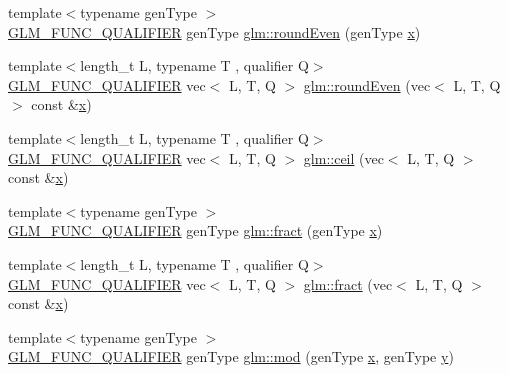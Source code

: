 \begin{DoxyCompactItemize}
\item 
{\footnotesize template$<$typename gen\+Type $>$ }\\\hyperlink{setup_8hpp_a33fdea6f91c5f834105f7415e2a64407}{G\+L\+M\+\_\+\+F\+U\+N\+C\+\_\+\+Q\+U\+A\+L\+I\+F\+I\+ER} gen\+Type \hyperlink{namespaceglm_ae02684863360f29d6e9fb9b5ad4ab5d9}{glm\+::round\+Even} (gen\+Type \hyperlink{_s_d_l__opengl_8h_ad0e63d0edcdbd3d79554076bf309fd47}{x})
\item 
{\footnotesize template$<$length\+\_\+t L, typename T , qualifier Q$>$ }\\\hyperlink{setup_8hpp_a33fdea6f91c5f834105f7415e2a64407}{G\+L\+M\+\_\+\+F\+U\+N\+C\+\_\+\+Q\+U\+A\+L\+I\+F\+I\+ER} vec$<$ L, T, Q $>$ \hyperlink{group__core__func__common_ga76b81785045a057989a84d99aeeb1578}{glm\+::round\+Even} (vec$<$ L, T, Q $>$ const \&\hyperlink{_s_d_l__opengl_8h_ad0e63d0edcdbd3d79554076bf309fd47}{x})
\item 
{\footnotesize template$<$length\+\_\+t L, typename T , qualifier Q$>$ }\\\hyperlink{setup_8hpp_a33fdea6f91c5f834105f7415e2a64407}{G\+L\+M\+\_\+\+F\+U\+N\+C\+\_\+\+Q\+U\+A\+L\+I\+F\+I\+ER} vec$<$ L, T, Q $>$ \hyperlink{group__core__func__common_gafb9d2a645a23aca12d4d6de0104b7657}{glm\+::ceil} (vec$<$ L, T, Q $>$ const \&\hyperlink{_s_d_l__opengl_8h_ad0e63d0edcdbd3d79554076bf309fd47}{x})
\item 
{\footnotesize template$<$typename gen\+Type $>$ }\\\hyperlink{setup_8hpp_a33fdea6f91c5f834105f7415e2a64407}{G\+L\+M\+\_\+\+F\+U\+N\+C\+\_\+\+Q\+U\+A\+L\+I\+F\+I\+ER} gen\+Type \hyperlink{group__core__func__common_ga8ba89e40e55ae5cdf228548f9b7639c7}{glm\+::fract} (gen\+Type \hyperlink{_s_d_l__opengl_8h_ad0e63d0edcdbd3d79554076bf309fd47}{x})
\item 
{\footnotesize template$<$length\+\_\+t L, typename T , qualifier Q$>$ }\\\hyperlink{setup_8hpp_a33fdea6f91c5f834105f7415e2a64407}{G\+L\+M\+\_\+\+F\+U\+N\+C\+\_\+\+Q\+U\+A\+L\+I\+F\+I\+ER} vec$<$ L, T, Q $>$ \hyperlink{group__core__func__common_ga2df623004f634b440d61e018d62c751b}{glm\+::fract} (vec$<$ L, T, Q $>$ const \&\hyperlink{_s_d_l__opengl_8h_ad0e63d0edcdbd3d79554076bf309fd47}{x})
\item 
{\footnotesize template$<$typename gen\+Type $>$ }\\\hyperlink{setup_8hpp_a33fdea6f91c5f834105f7415e2a64407}{G\+L\+M\+\_\+\+F\+U\+N\+C\+\_\+\+Q\+U\+A\+L\+I\+F\+I\+ER} gen\+Type \hyperlink{group__core__func__common_ga12201563ef902e3b07e0d1d7656efdb1}{glm\+::mod} (gen\+Type \hyperlink{_s_d_l__opengl_8h_ad0e63d0edcdbd3d79554076bf309fd47}{x}, gen\+Type \hyperlink{_s_d_l__opengl_8h_a1675d9d7bb68e1657ff028643b4037e3}{y})

\end{DoxyCompactItemize}
